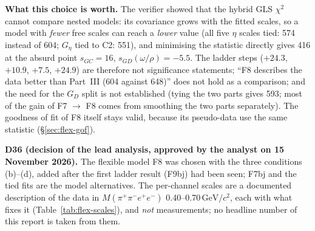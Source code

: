 \documentclass[11pt,a4paper]{article}
\newcommand{\Mfour}{\ensuremath{M(\pi^{+}\pi^{-}e^{+}e^{-})}\xspace}
\newcommand{\GeVcc}{\ensuremath{\mathrm{GeV}/c^{2}}\xspace}
\newcommand{\Geta}{\ensuremath{G_\eta}\xspace}
\newcommand{\notebox}[1]{\par\noindent\colorbox{orange!10}{\parbox{\dimexpr\linewidth-2\fboxsep\relax}{#1}}\par}
\begin{document}
\textbf{What this choice is worth.} The verifier showed that the hybrid GLS $\chi^2$ cannot compare nested models: its covariance grows with the
fitted scales, so a model with \emph{fewer} free scales can reach a \emph{lower} value (all five $\eta$ scales tied: 574 instead of 604; \Geta tied to
C2: 551), and minimising the statistic directly gives 416 at the absurd point $s_{GC}=16$, $s_{GD}(\omega/\rho)=-5.5$. The ladder steps
($+24.3$, $+10.9$, $+7.5$, $+24.9$) are therefore not significance statements; ``F8 describes the data better than Part~III (604 against 648)''
does not hold as a comparison; and the need for the $G_D$ split is not established (tying the two parts gives 593; most of the gain of F7 $\to$ F8
comes from smoothing the two parts separately). The goodness of fit of F8 itself stays valid, because its pseudo-data use the same statistic
(\S\ref{sec:flex-gof}).

\notebox{\textbf{D36 (decision of the lead analysis, approved by the analyst on 15 November 2026).} The flexible model F8 was chosen with the three conditions
(b)--(d), added after the first ladder result (F9bj) had been seen; F7bj and the tied fits are the model alternatives. The per-channel scales are a
documented description of the data in \Mfour 0.40--0.70\,\GeVcc, each with what fixes it (Table~\ref{tab:flex-scales}), and \emph{not}
measurements; no headline number of this report is taken from them.}
\end{document}

